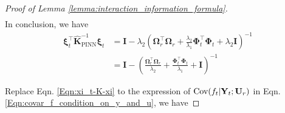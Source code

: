 \begin{proof}[Proof of Lemma \ref{lemma:interaction_information_formula}]
\begin{align}
    \end{align}
In conclusion, we have 
\begin{align}
\label{Eqn:xi_t-K-xi}
        \boldsymbol{\xi}_t^\top \mathbf{\widehat{K}}_\mathrm{PINN}^{-1} \boldsymbol{\xi}_t &= \mathbf{I} - \lambda_2 \left(\boldsymbol{\Omega}_r^\top\boldsymbol{\Omega}_r+\frac{\lambda_2} {\lambda_1} \boldsymbol{\Phi}_t^\top \boldsymbol{\Phi}_t+ \lambda_2 \mathbf{I}\right)^{-1} 
        \\
        &= \mathbf{I} -  \left(\frac{\boldsymbol{\Omega}_r^\top\boldsymbol{\Omega}_r}{\lambda_2}+\frac{\boldsymbol{\Phi}_t^\top \boldsymbol{\Phi}_t} {\lambda_1} + \mathbf{I}\right)^{-1} 
\end{align}

Replace Eqn. \ref{Eqn:xi_t-K-xi} to the expression of $\textup{Cov}(f_t \rvert \mathbf{Y}_t; \mathbf{U}_r)$ in Eqn. \ref{Eqn:covar_f_condition_on_y_and_u}, we have 


\end{proof}
